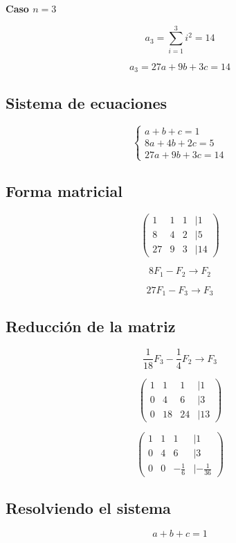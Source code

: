 \textbf{Caso \( n = 3 \)}

\[
a_3 = \sum_{i=1}^{3} i^2 = 14
\]

\[
a_3 = 27a + 9b + 3c = 14
\]

\subsection*{Sistema de ecuaciones}

\[
\begin{cases}
a + b + c = 1 \\
8a + 4b + 2c = 5 \\
27a + 9b + 3c = 14
\end{cases}
\]

\subsection*{Forma matricial}

\[
\begin{pmatrix}
1 & 1 & 1 & | 1 \\
8 & 4 & 2 & | 5 \\
27 & 9 & 3 & | 14
\end{pmatrix}
\]

\[
8F_1 - F_2 \rightarrow F_2
\]

\[
27F_1 - F_3 \rightarrow F_3
\]

\subsection*{Reducción de la matriz}

\[
\frac{1}{18} F_3 - \frac{1}{4} F_2 \rightarrow F_3
\]

\[
\begin{pmatrix}
1 & 1 & 1 & | 1 \\
0 & 4 & 6 & | 3 \\
0 & 18 & 24 & | 13
\end{pmatrix}
\]

\[
\begin{pmatrix}
1 & 1 & 1 & | 1 \\
0 & 4 & 6 & | 3 \\
0 & 0 & -\frac{1}{6} & | -\frac{1}{36}
\end{pmatrix}
\]

\subsection*{Resolviendo el sistema}

\[
a + b + c = 1
\]

